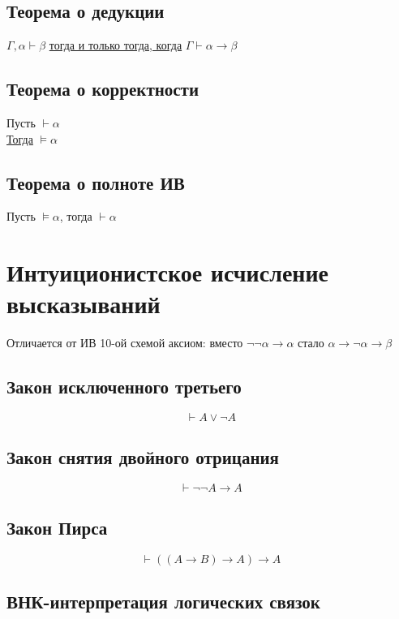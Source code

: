 \documentclass[english]{article}
\begin{document}
\subsection{Теорема о дедукции}
\label{sec:org272d106}
\begin{theorem}[о дедукции]
	\(\Gamma, \alpha \vdash \beta\) \uline{тогда и только тогда, когда} \(\Gamma \vdash \alpha \to \beta\)
	\label{org377dfdc}
\end{theorem}
\subsection{Теорема о корректности}
\label{sec:org8a5933c}
\begin{theorem}[о корректности]
	Пусть \(\vdash \alpha\) \\
	\uline{Тогда} \(\vDash \alpha\)
	\label{org517bca4}
\end{theorem}
\subsection{Теорема о полноте ИВ}
\label{sec:orge624408}
\begin{theorem}[о полноте]
	Пусть \(\vDash \alpha\), тогда \(\vdash \alpha\)
	\label{orgdcace4c}
\end{theorem}
\section{Интуиционистское исчисление высказываний}
\label{sec:org847b2aa}
Отличается от ИВ 10-ой схемой аксиом: вместо \(\neg \neg \alpha \to \alpha\) стало \(\alpha \to \neg \alpha \to \beta\)
\subsection{Закон исключенного третьего}
\label{sec:orgec2d432}
\[ \vdash A \vee \neg A \]
\subsection{Закон снятия двойного отрицания}
\label{sec:org126b825}
\[ \vdash \neg\neg A \to A \]
\subsection{Закон Пирса}
\label{sec:orgd83b715}
\[ \vdash ((A \to B) \to A) \to A \]
\subsection{ВНК-интерпретация логических связок}
\label{sec:org598c121}
\end{document}
